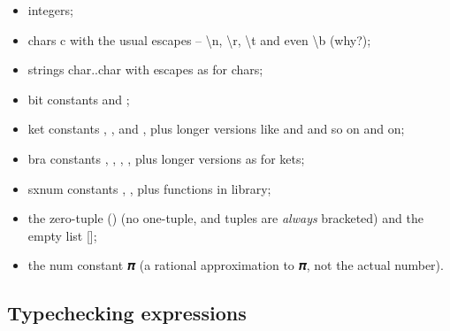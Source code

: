 \begin{itemize}
\item integers;
\item chars c with the usual escapes -- \textbackslash{n}, \textbackslash{r}, \textbackslash{t} and even \textbackslash{b} (why?);
\item strings char..char with escapes as for chars;
\item bit constants  and ;
\item ket constants \zero, \one, \plus{} and \minus, plus longer versions like  and \bv{+-+} and so on and on;
\item bra constants , , \vb{+}, \vb{-}, plus longer versions as for kets; 
\item sxnum constants , , plus functions in library;
\item the zero-tuple () (no one-tuple, and tuples are \emph{always} bracketed) and the empty list [];
\item the num constant 𝝅 (a rational approximation to 𝝅, not the actual number).
\end{itemize}

\subsection{Typechecking expressions}

